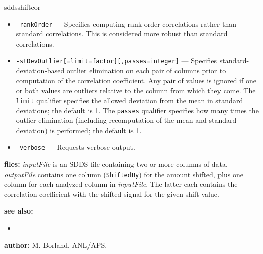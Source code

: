 \begin{sddsprog}{sddsshiftcor}
\begin{itemize}
      \item \verb|-rankOrder| --- Specifies computing rank-order correlations rather than standard correlations. This is considered more robust than standard correlations.
      \item \verb|-stDevOutlier[=limit=factor][,passes=integer]| --- Specifies standard-deviation-based outlier elimination on each pair of columns prior to computation of the correlation coefficient. Any pair of values is ignored if one or both values are outliers relative to the column from which they come. The \verb|limit| qualifier specifies the allowed deviation from the mean in standard deviations; the default is 1. The \verb|passes| qualifier specifies how many times the outlier elimination (including recomputation of the mean and standard deviation) is performed; the default is 1.
      \item \verb|-verbose| --- Requests verbose output.
    \end{itemize}
  \item \textbf{files:} \emph{inputFile} is an SDDS file containing two or more columns of data. \emph{outputFile} contains one column (\verb|ShiftedBy|) for the amount shifted, plus one column for each analyzed column in \emph{inputFile}. The latter each contains the correlation coefficient with the shifted signal for the given shift value.
  \item \textbf{see also:}
    \begin{itemize}
      \item {}
    \end{itemize}
  \item \textbf{author:} M. Borland, ANL/APS.
\end{sddsprog}

